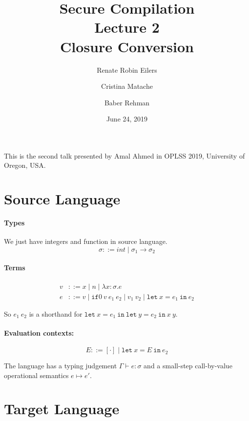 \documentclass{article}
\title{Secure Compilation \\ \Large{Lecture 2} \\ Closure Conversion}
\author{Renate Robin Eilers  \and Cristina Matache \and Baber Rehman}
\date{June 24, 2019}
\newcommand{\letin}[3]{\mathtt{let}\ #1=#2\ \mathtt{in}\ #3}
\newcommand{\ifzero}[3]{\mathtt{if}0\ #1\ #2\ #3}
\begin{document}
\maketitle

This is the second talk presented by Amal Ahmed in OPLSS 2019, University of Oregon, USA.


\section{Source Language}

\paragraph{Types}

We just have integers and function in source language. \\

\begin{equation*}
  \sigma ::= int \mid \sigma_1\rightarrow\sigma_2
\end{equation*}

\paragraph{Terms}

\begin{align*}
  v &::= x \mid n \mid \lambda x:\sigma.e \\
  e &::= v \mid \ifzero{v}{e_1}{e_2} \mid v_1\ v_2 \mid \letin{x}{e_1}{e_2}
\end{align*}

So $e_1\ e_2$ is a shorthand for $\letin{x}{e_1}{\letin{y}{e_2}{x\ y}}$.

\paragraph{Evaluation contexts:}

\begin{equation*}
  E ::= [\cdot] \mid \letin{x}{E}{e_2}
\end{equation*}

The language has a typing judgement $\Gamma \vdash e:\sigma$ and a small-step call-by-value operational semantics $e \mapsto e'$.

\section{Target Language}
\end{document}
